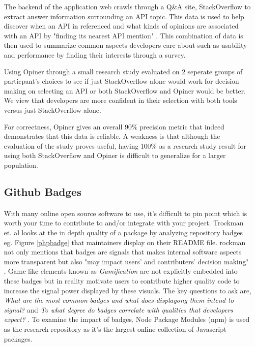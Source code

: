 \documentclass[12pt]{article}
\begin{document}
The backend of the application web crawls through a Q\&A site, StackOverflow \cite{stackoverflow} to extract answer
information surrounding an API topic. This data is used to help discover when an API in referenced and what kinds of opinions
are associated with an API by "finding its nearest API mention" \cite{opinerarticle}. 
This combination of data is then used to summarize common aspects developers care about such as usability and performance by finding their interests
through a survey.

Using Opiner \cite{opiner} through a small research study evaluated on 2 seperate groups of particpant's choices to see if 
just StackOverflow \cite{stackoverflow} alone would work for decision making on selecting an API or both StackOverflow and Opiner would be better.
We view that developers are more confident in their selection with both tools versus just StackOverflow alone. 

For correctness, Opiner gives an overall 90\% precision metric that indeed demonstrates that this data is reliable.
A weakness is that although the evaluation of the study proves useful, having 100\% as a research study result for using both StackOverflow and Opiner
is difficult to generalize for a larger population. 

\subsection{Github Badges}
\paragraph{}
With many online open source software to use, it's difficult to pin point which is worth your time to contribute to and/or integrate with your project.
Trockman et. al \cite{githubbadges} looks at the in depth quality of a package by analyzing repository badges eg. Figure \ref{phpbadge} that maintainers display on their README file.
rockman not only mentions that badges are signals that makes internal software aspects more transparent but also "may impact users' and contributers' decision making" \cite{githubbadges}.
Game like elements known as \textit{Gamification} are not explicitly embedded into these badges but in reality motivate users to contribute higher quality code to increase the signal power
displayed by these visuals. 
The key questions to ask are, \textit{What are the most common badges and what does displayong them intend to signal?} and 
\textit{To what degree do badges correlate with qualities that developers expect?} \cite{githubbadges}.
To examine the impact of badges, Node Package Modules (npm) \cite{npm} is used as the research repository as it's the largest online collection of Javascript packages. 
\end{document}
